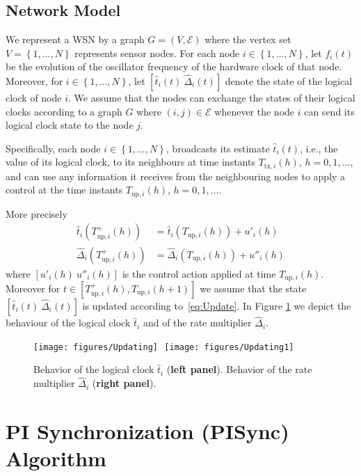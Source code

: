 \documentclass[english,a4paper,10pt,final]{article}
\numberwithin{equation}{section}
\numberwithin{figure}{section}
\begin{document}
\subsection{Network Model}

We represent a WSN  by a graph $G=(V,\mathcal{E})$ where the vertex set $V=\left\{1,\ldots,N\right\}$ represents sensor nodes. For each node $i\in\left\{1,\ldots,N\right\}$, let $f_i(t)$ be the evolution of the oscillator frequency of the hardware clock of that node. Moreover, for $i\in\left\{1,\ldots,N\right\}$, let $[\hat{t}_i(t)\ \hat{\Delta}_i(t)]$ denote the state of the logical clock of node $i$. We assume that the nodes can exchange the states of their logical clocks according to a graph $G$ where $(i,j)\in \mathcal{E}$ whenever the node $i$ can send its logical clock state to the node $j$.  
 
Specifically, each node $i\in \left\{1,\ldots,N\right\}$, broadcasts its estimate $\hat{t}_i(t)$, i.e., the value of its logical clock, to its neighbours at time instants $T_{\mathrm{tx},i}(h)$, $h=0,1,\dots$, and can use any information it receives from the neighbouring nodes to apply a control at the time instants $T_{\mathrm{up},i}(h)$, $h=0,1,\dots$.

More precisely
\begin{align}
  \label{eq:Update_i}
  \hat{t}_i(T_{\mathrm{up},i}^+(h)) &= \hat{t}_i(T_{\mathrm{up},i}(h))+ u'_i(h)\nonumber\\
\hat{\Delta}_i(T_{\mathrm{up},i}^+(h))& = \hat{\Delta}_i(T_{\mathrm{up},i}(h))+ u''_i(h)
\end{align}
where $[u'_i(h)\ u''_i(h)]$ is the control action applied at time $T_{\mathrm{up},i}(h)$.
Moreover for $t\in\left[T_{\mathrm{up},i}^+(h), T_{\mathrm{up},i}(h+1)\right]$ we assume that the state $[\hat{t}_i(t)\ \hat{\Delta}_i(t)]$ is updated according to~\eqref{eq:Update}. In Figure \ref{fig:Updating} we depict the behaviour of the logical clock $\hat{t}_i$ and of the rate multiplier $\hat{\Delta}_i$.


\begin{figure}[!t]
\centering
\texttt{[image: figures/Updating]}\,\,\,\,\texttt{[image: figures/Updating1]}
\caption{Behavior of the logical clock $\hat{t}_i$ ({\bf left panel}). Behavior of the rate multiplier $\hat{\Delta}_i$ ({\bf right panel}).
}
\label{fig:Updating}
\end{figure}


\section{PI Synchronization (PISync) Algorithm }
\label{sec:PI}
\end{document}
